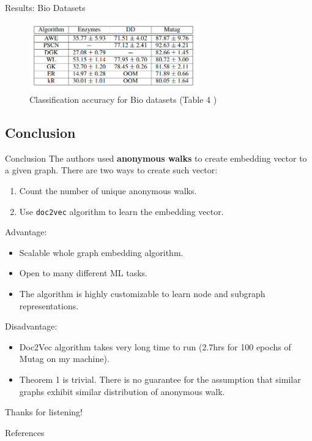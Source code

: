 \documentclass{beamer}
\begin{document}
    \begin{frame}{Results: Bio Datasets}
        \begin{figure}
            \centering
            \includegraphics[width=0.65\textwidth]{imgs/result_bio.png}
            \caption{Classification accuracy for Bio datasets
            (Table 4 \cite{pmlr-v80-ivanov18a})}
            \label{fig:bioresults}
        \end{figure}
    \end{frame}

    \subsection{Conclusion}

    \begin{frame}{Conclusion}
        \pause
        The authors used \textbf{anonymous walks} to create embedding 
        vector to a given graph. There are two ways to create such vector:
        \pause
        \begin{enumerate}
            \item Count the number of unique anonymous walks.
            \pause
            \item Use \texttt{doc2vec} algorithm to learn the embedding vector.
        \end{enumerate}
        \pause
        Advantage:
        \pause
        \begin{itemize}
            \item Scalable whole graph embedding algorithm.
            \pause
            \item Open to many different ML tasks.
            \pause
            \item The algorithm is highly customizable to learn node and 
            subgraph representations.
        \end{itemize}
        \pause
        Disadvantage:
        \pause
        \begin{itemize}
            \item Doc2Vec algorithm takes very long time to run 
            (2.7hrs for 100 epochs of Mutag on my machine).
            \pause
            \item Theorem 1 is trivial. There is no guarantee for the
            assumption that similar graphs exhibit similar distribution of
            anonymous walk.
        \end{itemize}
    \end{frame}

    \begin{frame}[focus]
        Thanks for listening!
    \end{frame}

    \appendix
    \begin{frame}{References}
        \nocite{*}
        
        
    \end{frame}
\end{document}
